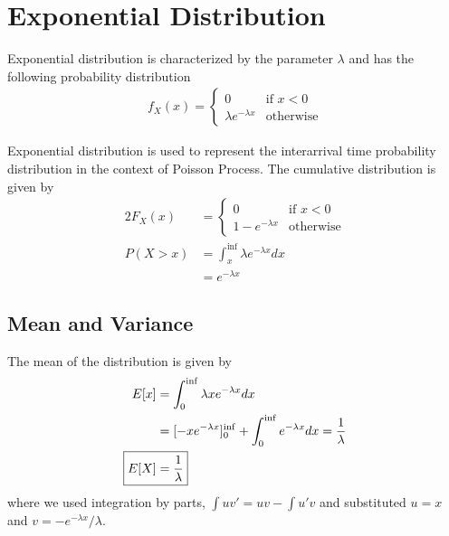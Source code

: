 \documentclass[../../probability-notes.tex]{subfiles}
\begin{document}
    \section{Exponential Distribution}
    Exponential distribution is characterized by the parameter $\lambda$ and has the following probability distribution
    \begin{align*}
        f_{X}(x) = \begin{cases} 0 &\mbox{if $x < 0$}\\
                                \lambda e^{-\lambda x} &\mbox{otherwise} \end{cases}
    \end{align*}

    Exponential distribution is used to represent the interarrival time probability distribution in the context of Poisson Process. The cumulative distribution is given by
    \begin{alignat*}{2}
        F_{X}(x) &= \begin{cases} 0 &\mbox{if $x < 0$}\\
                                1 - e^{-\lambda x} &\mbox{otherwise} \end{cases}\\
        P(X > x) &= \int_{x}^{\inf} \lambda e^{-\lambda x} dx\\
        &= e^{-\lambda x}
    \end{alignat*}

    \subsection{Mean and Variance}
    The mean of the distribution is given by
    \begin{align*}
        E[x] &= \int_{0}^{\inf} \lambda x e^{-\lambda x} dx\\
        &= [-x e^{-\lambda x}]_{0}^{\inf} + \int_{0}^{\inf} e^{-\lambda x} dx = \frac{1}{\lambda}\\
        \Aboxed{E[X] &= \frac{1}{\lambda}}
    \end{align*}
    where we used integration by parts, $\int uv' = uv - \int u'v$ and substituted $u = x$ and $v = -e^{-\lambda x}/\lambda$.\newline
\end{document}
